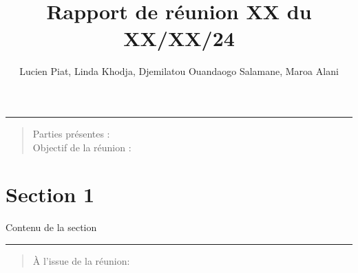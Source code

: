 \documentclass[a4paper, 11pt]{article}
\title{Rapport de réunion XX du XX/XX/24}
\author{Lucien Piat, Linda Khodja, Djemilatou Ouandaogo Salamane, Maroa Alani}
\begin{document}
\maketitle
\noindent\rule{8cm}{0.4pt}
\begin{quote}
    Parties présentes : \\
    Objectif de la réunion : 
\end{quote}

\section{Section 1}
Contenu de la section 


\noindent\rule{8cm}{0.4pt}
\begin{quotation}
    À l'issue de la réunion:
\end{quotation}
\end{document}
